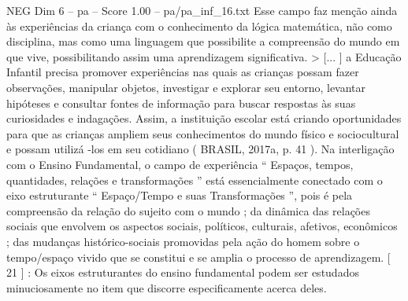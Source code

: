 \begin{textsample}{NEG Dim 6 – pa – Score 1.00 – pa/pa\_inf\_16.txt}
Esse campo faz menção ainda às experiências da criança com o conhecimento da lógica matemática, não como disciplina, mas como uma linguagem que possibilite a compreensão do mundo em que vive, possibilitando assim uma aprendizagem significativa. > [... ] a Educação Infantil precisa promover experiências nas quais as crianças possam fazer observações, manipular objetos, investigar e explorar seu entorno, levantar hipóteses e consultar fontes de informação para buscar respostas às suas curiosidades e indagações.
Assim, a instituição escolar está criando oportunidades para que as crianças ampliem seus conhecimentos do mundo físico e sociocultural e possam utilizá -los em seu cotidiano ( BRASIL, 2017a, p. 41 ).
Na interligação com o Ensino Fundamental, o campo de experiência “ Espaços, tempos, quantidades, relações e transformações ” está essencialmente conectado com o eixo estruturante “ Espaço/Tempo e suas Transformações ”, pois é pela compreensão da relação do sujeito com o mundo ; da dinâmica das relações sociais que envolvem os aspectos sociais, políticos, culturais, afetivos, econômicos ; das mudanças histórico-sociais promovidas pela ação do homem sobre o tempo/espaço vivido que se constitui e se amplia o processo de aprendizagem. [ 21 ] : Os eixos estruturantes do ensino fundamental podem ser estudados minuciosamente no item que discorre especificamente acerca deles.

\end{textsample}
